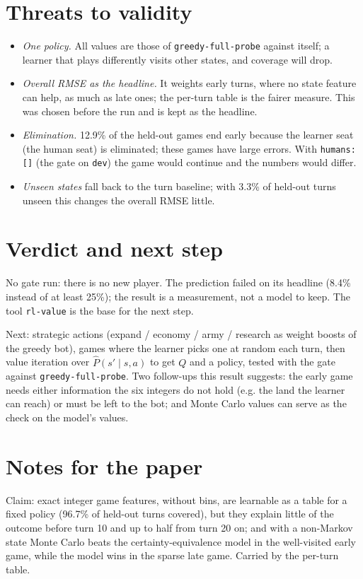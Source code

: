 \documentclass{../polyexp}
\begin{document}

\section{Threats to validity}
\begin{itemize}
  \item \emph{One policy.} All values are those of \texttt{greedy-full-probe} against itself; a learner that
        plays differently visits other states, and coverage will drop.
  \item \emph{Overall RMSE as the headline.} It weights early turns, where no state feature can help, as much
        as late ones; the per-turn table is the fairer measure. This was chosen before the run and is kept
        as the headline.
  \item \emph{Elimination.} 12.9\% of the held-out games end early because the learner seat (the human seat) is
        eliminated; these games have large errors. With \texttt{humans: []} (the gate on \texttt{dev}) the
        game would continue and the numbers would differ.
  \item \emph{Unseen states} fall back to the turn baseline; with 3.3\% of held-out turns unseen this changes
        the overall RMSE little.
\end{itemize}

\section{Verdict and next step}
No gate run: there is no new player. The prediction failed on its headline (8.4\% instead of at least 25\%);
the result is a measurement, not a model to keep. The tool \texttt{rl-value} is the base for the next step.

Next: strategic actions (expand / economy / army / research as weight boosts of the greedy bot), games where
the learner picks one at random each turn, then value iteration over $\hat P(s' \mid s, a)$ to get $Q$ and a
policy, tested with the gate against \texttt{greedy-full-probe}. Two follow-ups this result suggests: the
early game needs either information the six integers do not hold (e.g. the land the learner can reach) or
must be left to the bot; and Monte Carlo values can serve as the check on the model's values.

\section{Notes for the paper}
Claim: exact integer game features, without bins, are learnable as a table for a fixed policy (96.7\% of
held-out turns covered), but they explain little of the outcome before turn 10 and up to half from turn 20
on; and with a non-Markov state Monte Carlo beats the certainty-equivalence model in the well-visited early
game, while the model wins in the sparse late game. Carried by the per-turn table.

\end{document}
